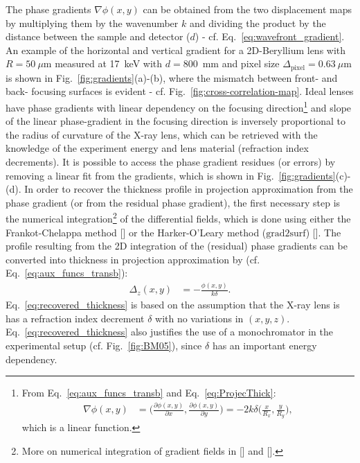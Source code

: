 \begin{refsection}
The phase gradients $\nabla\phi(x,y)$ can be obtained from the two displacement maps by multiplying them by the wavenumber $k$ and dividing the product by the distance between the sample and detector ($d$) - cf. Eq.~\ref{eq:wavefront_gradient}. An example of the horizontal and vertical gradient for a 2D-Beryllium lens with $R=50~\mu$m measured at 17~keV with $d=800$~mm and pixel size $\Delta_\text{pixel}= 0.63~\mu$m is shown in Fig.~\ref{fig:gradients}(a)-(b), where the mismatch between front- and back- focusing surfaces is evident - cf. Fig.~\ref{fig:cross-correlation-map}. Ideal lenses have phase gradients with linear dependency on the focusing direction\footnote{From Eq.~\ref{eq:aux_funcs_transb} and Eq.~\ref{eq:ProjecThick}: 
\begin{align*}
    \nabla\phi(x,y) & = \Bigg(\frac{\partial \phi(x,y)}{\partial x},\frac{\partial \phi(x,y)}{\partial y}  \Bigg) = -2k\delta\Bigg(\frac{x}{R_x},\frac{y}{R_y}\Bigg),
\end{align*}{}
which is a linear function.} and slope of the linear phase-gradient in the focusing direction is inversely proportional to the radius of curvature of the X-ray lens, which can be retrieved with the knowledge of the experiment energy and lens material (refraction index decrements). It is possible to access the phase gradient residues (or errors) by removing a linear fit from the gradients, which is shown in Fig.~\ref{fig:gradients}(c)-(d). In order to recover the thickness profile in projection approximation from the phase gradient (or from the residual phase gradient), the first necessary step is the numerical integration\footnote{More on numerical integration of gradient fields in [\cite{Huang2015}] and [\cite{Agrawal2006}].} of the differential fields, which is done using either the Frankot-Chelappa method [\cite{Frankot1988}] or the Harker-O'Leary method ($\text{grad2surf}$) [\cite{Harker2015}]. The profile resulting from the 2D integration of the (residual) phase gradients can be converted into thickness in projection approximation by (cf. Eq.~\ref{eq:aux_funcs_transb}):
\begin{align}\label{eq:recovered_thickness}
     \Delta_z(x,y)&=-\frac{\phi(x,y)}{k\delta}.
\end{align}{}
Eq.~\ref{eq:recovered_thickness} is based on the assumption that the X-ray lens is has a refraction index decrement $\delta$ with no variations in $(x,y,z)$. Eq.~\ref{eq:recovered_thickness} also justifies the use of a monochromator in the experimental setup (cf. Fig.~\ref{fig:BM05}), since $\delta$ has an important energy dependency.


\end{refsection}
